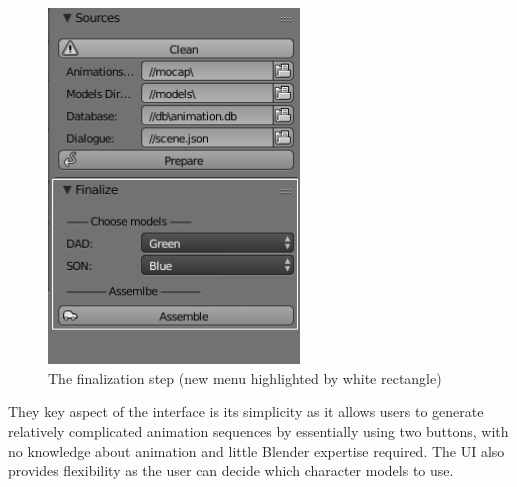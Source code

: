 \begin{figure}[H]
\centerline{\includegraphics[width = 18em]{img/ui_finalize.png}}
\caption{The finalization step (new menu highlighted by white rectangle)}\label{fig:ui_finalize}
\end{figure}

They key aspect of the interface is its simplicity as it allows users to generate relatively complicated animation sequences by essentially using two buttons, with no knowledge about animation and little Blender expertise required. The UI also provides flexibility as the user can decide which character models to use.





